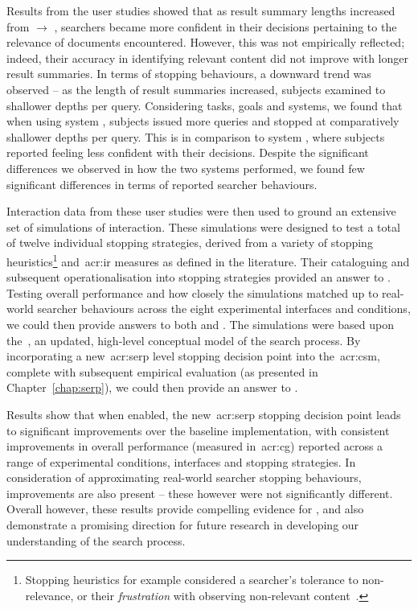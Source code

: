 Results from the user studies showed that as result summary lengths increased from  $\rightarrow$ , searchers became more confident in their decisions pertaining to the relevance of documents encountered. However, this was not empirically reflected; indeed, their accuracy in identifying relevant content did not improve with longer result summaries. In terms of stopping behaviours, a downward trend was observed -- as the length of result summaries increased, subjects examined to shallower depths per query. Considering tasks, goals and systems, we found that when using system , subjects issued more queries and stopped at comparatively shallower depths per query. This is in comparison to system , where subjects reported feeling less confident with their decisions. Despite the significant differences we observed in how the two systems performed, we found few significant differences in terms of reported searcher behaviours.

Interaction data from these user studies were then used to ground an extensive set of simulations of interaction. These simulations were designed to test a total of twelve individual stopping strategies, derived from a variety of stopping heuristics\footnote{Stopping heuristics for example considered a searcher's tolerance to non-relevance, or their \emph{frustration} with observing non-relevant content~\citep{kraft1979stopping_rules}.} and~\gls{acr:ir} measures as defined in the literature. Their cataloguing and subsequent operationalisation into stopping strategies provided an answer to . Testing overall performance and how closely the simulations matched up to real-world searcher behaviours across the eight experimental interfaces and conditions, we could then provide answers to both  and . The simulations were based upon the~, an updated, high-level conceptual model of the search process. By incorporating a new~\gls{acr:serp} level stopping decision point into the~\gls{acr:csm}, complete with subsequent empirical evaluation (as presented in Chapter~\ref{chap:serp}), we could then provide an answer to .

Results show that when enabled, the new~\gls{acr:serp} stopping decision point leads to significant improvements over the baseline implementation, with consistent improvements in overall performance (measured in~\gls{acr:cg}) reported across a range of experimental conditions, interfaces and stopping strategies. In consideration of approximating real-world searcher stopping behaviours, improvements are also present -- these however were not significantly different. Overall however, these results provide compelling evidence for , and also demonstrate a promising direction for future research in developing our understanding of the search process.

